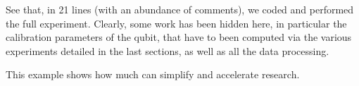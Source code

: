See that, in 21 lines (with an abundance of comments), we coded and performed the full experiment.
Clearly, some work has been hidden here, in particular the calibration parameters of the qubit, that have to been computed via the various experiments detailed in the last sections, as well as all the data processing.

This example shows how much \Qibosoq can simplify and accelerate research.